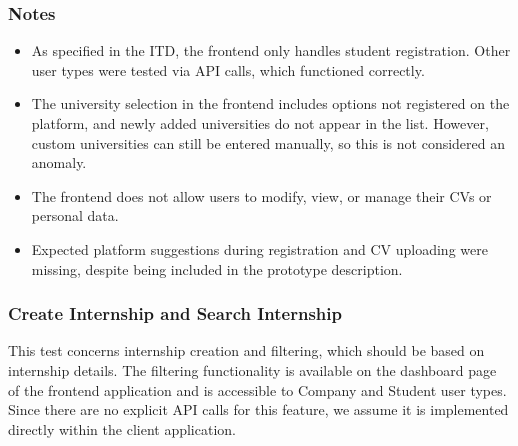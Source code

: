 \subsubsection*{Notes}
\begin{itemize}
    \item As specified in the ITD, the frontend only handles student registration. Other user types were tested via API calls, which functioned correctly.
    \item The university selection in the frontend includes options not registered on the platform, and newly added universities do not appear in the list. However, custom universities can still be entered manually, so this is not considered an anomaly.
    \item The frontend does not allow users to modify, view, or manage their CVs or personal data.
    \item Expected platform suggestions during registration and CV uploading were missing, despite being included in the prototype description.
\end{itemize}

\subsubsection{Create Internship and Search Internship}
This test concerns internship creation and filtering, which should be based on internship details. The filtering functionality is available on the dashboard page of the frontend application and is accessible to Company and Student user types. Since there are no explicit API calls for this feature, we assume it is implemented directly within the client application.
